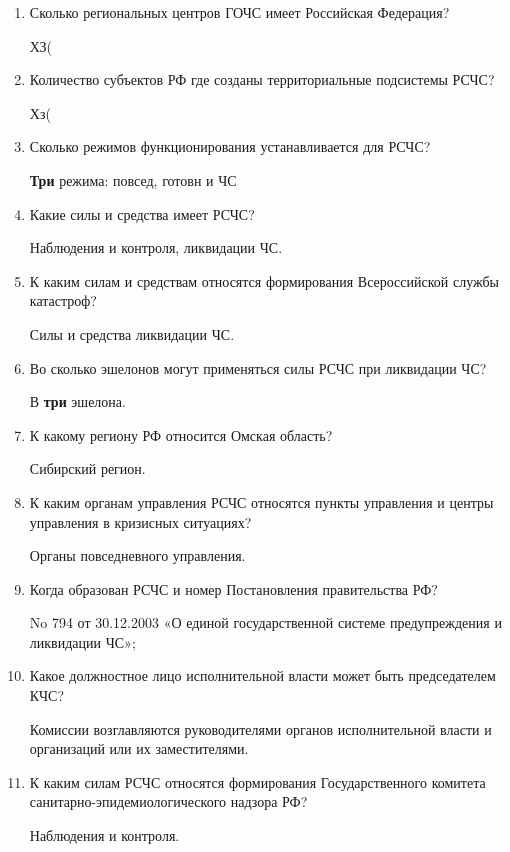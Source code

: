 \documentclass[oneside,final,14pt]{extreport}
\begin{document}
\begin{enumerate}
	\item  Сколько региональных центров ГОЧС имеет Российская Федерация?
	
	ХЗ(
	
	\item  Количество субъектов РФ где созданы территориальные подсистемы РСЧС?
	
	Хз(
	
	\item Сколько режимов функционирования устанавливается для РСЧС?
	
	\textbf{Три} режима: повсед, готовн и ЧС
	
	\item  Какие силы и средства имеет РСЧС?
	
	Наблюдения и контроля, ликвидации ЧС.
	
	\item  К каким силам и средствам относятся формирования Всероссийской службы катастроф?
	
	Силы и средства ликвидации ЧС.
	
	\item  Во сколько эшелонов могут применяться силы РСЧС при ликвидации ЧС?
	
	В \textbf{три} эшелона.
	
	\item  К какому региону РФ относится Омская область?
	
	Сибирский регион.
	
	\item  К каким органам управления РСЧС относятся пункты управления и центры управления в кризисных ситуациях?
	
	Органы повседневного управления.
	
	\item  Когда образован РСЧС и номер Постановления правительства РФ?
	
	No 794 от 30.12.2003 «О единой государственной системе предупреждения
	и ликвидации ЧС»;
	
	\item  Какое должностное лицо исполнительной власти может быть председателем КЧС?
	
	Комиссии
	возглавляются руководителями органов исполнительной власти и
	организаций или их заместителями.
	
	\item  К каким силам РСЧС относятся формирования Государственного комитета санитарно-эпидемиологического надзора РФ?
	
	Наблюдения и контроля.
	

\end{enumerate}
\end{document}

